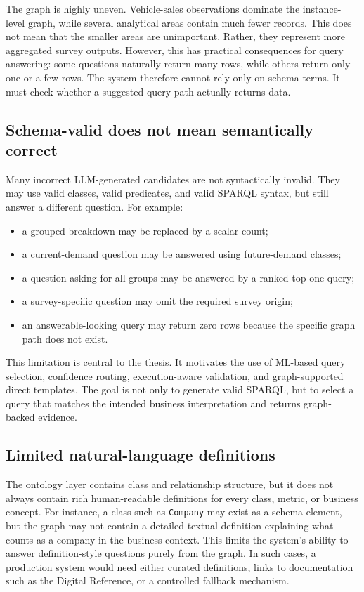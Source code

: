 The graph is highly uneven. Vehicle-sales observations dominate the instance-level graph, while several analytical areas contain much fewer records. This does not mean that the smaller areas are unimportant. Rather, they represent more aggregated survey outputs. However, this has practical consequences for query answering: some questions naturally return many rows, while others return only one or a few rows. The system therefore cannot rely only on schema terms. It must check whether a suggested query path actually returns data.

\subsection{Schema-valid does not mean semantically correct}

Many incorrect LLM-generated candidates are not syntactically invalid. They may use valid classes, valid predicates, and valid SPARQL syntax, but still answer a different question. For example:

\begin{itemize}
    \item a grouped breakdown may be replaced by a scalar count;
    \item a current-demand question may be answered using future-demand classes;
    \item a question asking for all groups may be answered by a ranked top-one query;
    \item a survey-specific question may omit the required survey origin;
    \item an answerable-looking query may return zero rows because the specific graph path does not exist.
\end{itemize}

This limitation is central to the thesis. It motivates the use of ML-based query selection, confidence routing, execution-aware validation, and graph-supported direct templates. The goal is not only to generate valid SPARQL, but to select a query that matches the intended business interpretation and returns graph-backed evidence.

\subsection{Limited natural-language definitions}

The ontology layer contains class and relationship structure, but it does not always contain rich human-readable definitions for every class, metric, or business concept. For instance, a class such as \texttt{Company} may exist as a schema element, but the graph may not contain a detailed textual definition explaining what counts as a company in the business context. This limits the system's ability to answer definition-style questions purely from the graph. In such cases, a production system would need either curated definitions, links to documentation such as the Digital Reference, or a controlled fallback mechanism.


